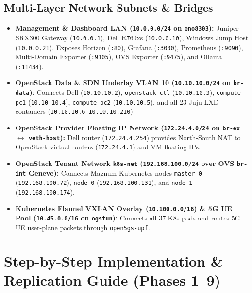 \documentclass[11pt,a4paper]{article}
\begin{document}
\subsection{Multi-Layer Network Subnets \& Bridges}
\begin{itemize}
    \item \textbf{Management \& Dashboard LAN (\texttt{10.0.0.0/24} on \texttt{eno8303}):} Juniper SRX300 Gateway (\texttt{10.0.0.1}), Dell R760xs (\texttt{10.0.0.10}), Windows Jump Host (\texttt{10.0.0.21}). Exposes Horizon (\texttt{:80}), Grafana (\texttt{:3000}), Prometheus (\texttt{:9090}), Multi-Domain Exporter (\texttt{:9105}), OVS Exporter (\texttt{:9475}), and Ollama (\texttt{:11434}).
    \item \textbf{OpenStack Data \& SDN Underlay VLAN 10 (\texttt{10.10.10.0/24} on \texttt{br-data}):} Connects Dell (\texttt{10.10.10.2}), \texttt{openstack-ctl} (\texttt{10.10.10.3}), \texttt{compute-pc1} (\texttt{10.10.10.4}), \texttt{compute-pc2} (\texttt{10.10.10.5}), and all 23 Juju LXD containers (\texttt{10.10.10.6}--\texttt{10.10.10.210}).
    \item \textbf{OpenStack Provider Floating IP Network (\texttt{172.24.4.0/24} on \texttt{br-ex} $\leftrightarrow$ \texttt{veth-host}):} Dell router (\texttt{172.24.4.254}) provides North-South NAT to OpenStack virtual routers (\texttt{172.24.4.1}) and VM floating IPs.
    \item \textbf{OpenStack Tenant Network \texttt{k8s-net} (\texttt{192.168.100.0/24} over OVS \texttt{br-int} Geneve):} Connects Magnum Kubernetes nodes \texttt{master-0} (\texttt{192.168.100.72}), \texttt{node-0} (\texttt{192.168.100.131}), and \texttt{node-1} (\texttt{192.168.100.174}).
    \item \textbf{Kubernetes Flannel VXLAN Overlay (\texttt{10.100.0.0/16}) \& 5G UE Pool (\texttt{10.45.0.0/16} on \texttt{ogstun}):} Connects all 37 K8s pods and routes 5G UE user-plane packets through \texttt{open5gs-upf}.
\end{itemize}

\newpage
\section{Step-by-Step Implementation \& Replication Guide (Phases 1--9)}
\end{document}
